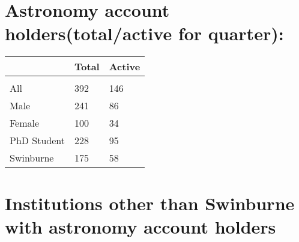 \documentclass{article}%
\begin{document}
\section{Astronomy account holders(total/active for quarter): }%

%
\begin{longtabu}{X[l] X[r] X[r]}%
\textbf{}&\textbf{Total}&\textbf{Active}\\%
\hline%
&&\\%
All&392&146\\%
\hline%
Male&241&86\\%
\hline%
Female&100&34\\%
\hline%
PhD Student&228&95\\%
\hline%
Swinburne&175&58\\%
\hline%
\end{longtabu}%
\section{Institutions other than Swinburne with astronomy account holders}%
\end{document}
